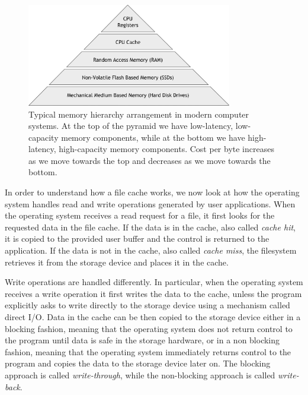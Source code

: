 \begin{figure}[!htb]
  \centering
  \includegraphics[width=0.8\textwidth]{chapters/figures/mem-hierarchy}
  \caption{Typical memory hierarchy arrangement in modern computer systems. At the top of the pyramid we have low-latency, low-capacity memory components, while at the 
  bottom we have high-latency, high-capacity memory components. Cost per byte increases as we move towards the top and decreases as we move towards the bottom.}
  \label{figure: mem-hierarchy}
\end{figure}

In order to understand how a file cache works, we now look at how the operating system handles read and write operations generated by user applications. When the operating system receives
a read request for a file, it first looks for the requested data in the file cache. If the data is in the cache, also called \textit{cache hit}, it is copied to the provided user buffer and 
the control is returned to the application. If the data is not in the cache, also called \textit{cache miss}, the filesystem retrieves it from the storage device and places it in the cache. 

Write operations are handled differently. In particular, when the operating system receives a write operation it first writes the data to the cache, unless the program explicitly asks to write 
directly to the storage device using a mechanism called direct I/O. Data in the cache can be then copied to the storage device either in a blocking fashion, meaning that the operating system 
does not return control to the program until data is safe in the storage hardware, or in a non blocking fashion, meaning that the operating system immediately returns control to the program 
and copies the data to the storage device later on. The blocking approach is called \textit{write-through}, while the non-blocking approach is called \textit{write-back}.

